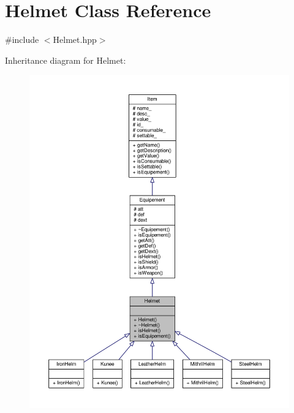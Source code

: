 \hypertarget{class_helmet}{\section{Helmet Class Reference}
\label{class_helmet}
}


{\ttfamily \#include $<$Helmet.\-hpp$>$}



Inheritance diagram for Helmet\-:
\nopagebreak
\begin{figure}[H]
\begin{center}
\leavevmode
\includegraphics[width=350pt]{class_helmet__inherit__graph}
\end{center}
\end{figure}


